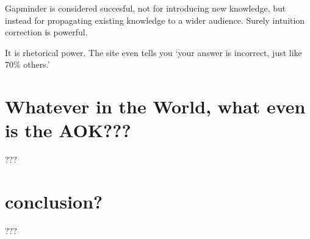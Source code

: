 \documentclass[a4paper, 12pt]{article}
\begin{document}
Gapminder is considered succesful, not for introducing new knowledge, but instead
for propagating existing knowledge to a wider audience.
Surely intuition correction is powerful.

It is rhetorical power.  The site even tells you `your answer is incorrect, just like 70\% others.'


\section{Whatever in the World, what even is the AOK???}
???

\section{conclusion?}
???

\newpage
\printbibliography
\end{document}

